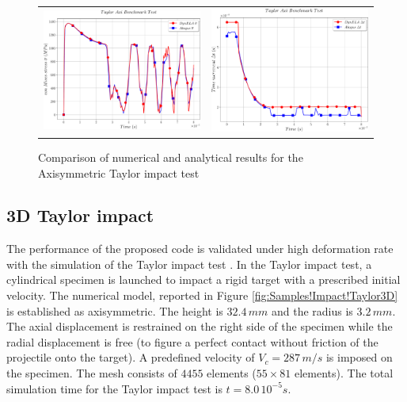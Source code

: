 \begin{figure}[h]
\begin{centering}
\begin{tabular}{cc}
\includegraphics[width=0.45\columnwidth]{Figures/Samples/Impact/Taylor-Axi_vonMises} & \includegraphics[width=0.45\columnwidth]{Figures/Samples/Impact/Taylor-Axi_timeStep}\tabularnewline
\end{tabular}
\par\end{centering}
\caption{Comparison of numerical and analytical results for the Axisymmetric
Taylor impact test\label{fig:Samples!Impact!TaylorAxi-comparison}}
\end{figure}


\subsection{3D Taylor impact}

The performance of the proposed code is validated under high deformation
rate with the simulation of the Taylor impact test \cite{taylor_1946}.
In the Taylor impact test, a cylindrical specimen is launched to impact
a rigid target with a prescribed initial velocity. The numerical model,
reported in Figure \ref{fig:Samples!Impact!Taylor3D} is established
as axisymmetric. The height is $32.4\,mm$ and the radius is $3.2\,mm$.
The axial displacement is restrained on the right side of the specimen
while the radial displacement is free (to figure a perfect contact
without friction of the projectile onto the target). A predefined
velocity of $V_{c}=287\,m/s$ is imposed on the specimen. The mesh
consists of $4455$ elements ($55\times81$ elements). The total simulation
time for the Taylor impact test is $t=8.0\,10^{-5}s$.

